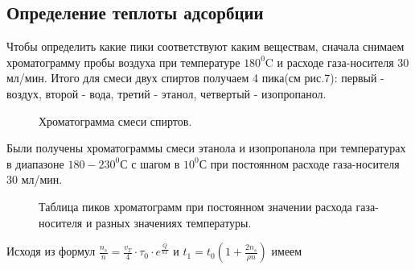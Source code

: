 \documentclass[12pt]{article}
\begin{document}
\begin{flushleft}
\subsection{Определение теплоты адсорбции}
Чтобы определить какие пики соответствуют каким веществам, сначала снимаем хроматограмму пробы воздуха при температуре $180 ^0$C и расходе газа-носителя 30 мл/мин. Итого для смеси двух спиртов получаем 4 пика(см рис.7): первый - воздух, второй - вода, третий - этанол, четвертый - изопропанол.\\
\begin{figure}[!h]
\caption{Хроматограмма смеси спиртов.}
\label{ris:image}
\end{figure}
Были получены хроматограммы смеси этанола и изопропанола при температурах в диапазоне $180-230^0$С с шагом в $10^0$С при постоянном расходе газа-носителя 30 мл/мин.
\begin{figure}[!h]
\caption{Таблица пиков хроматограмм при постоянном значении расхода газа-носителя и разных значениях температуры.}
\label{ris:image}
\end{figure}
Исходя из формул $\frac{n_s}{n}=\frac{v_T}{4} \cdot  \tau_0 \cdot e^{\frac{Q}{kT}}$ и $t_1=t_0 (1+ \frac{2n_s}{\rho n})$ имеем


\end{flushleft}
\end{document}

